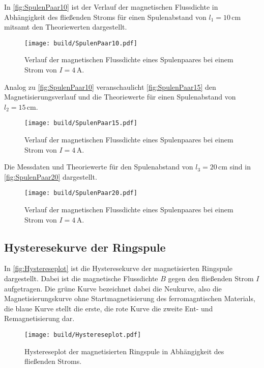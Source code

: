 In \autoref{fig:SpulenPaar10} ist der Verlauf der magnetischen Flussdichte in Abhängigkeit des fließenden Stroms
für einen Spulenabstand von $l_1= 10 \, \unit{\centi\meter}$ mitsamt den Theoriewerten dargestellt.
  \begin{figure}[H]
    \centering
    \texttt{[image: build/SpulenPaar10.pdf]}
    \caption{Verlauf der magnetischen Flussdichte eines Spulenpaares bei einem Strom von $I= 4 \, \unit{\ampere}$.}
    \label{fig:SpulenPaar10}
  \end{figure}

  \newpage
  
  Analog zu \autoref{fig:SpulenPaar10} veranschaulicht \autoref{fig:SpulenPaar15} den Magnetisierungsverlauf und die Theoriewerte
  für einen Spulenabstand von $l_2=15\, \unit{\centi\meter}$.
  \begin{figure}[H]
    \centering
    \texttt{[image: build/SpulenPaar15.pdf]}
    \caption{Verlauf der magnetischen Flussdichte eines Spulenpaares bei einem Strom von $I= 4 \, \unit{\ampere}$.}
    \label{fig:SpulenPaar15}
  \end{figure}

  \newpage

  Die Messdaten und Theoriewerte für den Spulenabstand von $l_3=20\, \unit{\centi\meter}$ sind in 
  \autoref{fig:SpulenPaar20} dargestellt.
  \begin{figure}[H]
    \centering
    \texttt{[image: build/SpulenPaar20.pdf]}
    \caption{Verlauf der magnetischen Flussdichte eines Spulenpaares bei einem Strom von $I= 4 \, \unit{\ampere}$.}
    \label{fig:SpulenPaar20}
  \end{figure}

\newpage

\subsection{Hysteresekurve der Ringspule}

In \autoref{fig:Hystereseplot} ist die Hysteresekurve der magnetisierten Ringspule dargestellt. Dabei ist die magnetische
Flussdichte $B$ gegen den fließenden Strom $I$ aufgetragen. Die grüne Kurve bezeichnet dabei die Neukurve, also die Magnetisierungskurve
ohne Startmagnetisierung des ferromagntischen Materials, die blaue Kurve stellt die erste, die rote Kurve die zweite Ent- und Remagnetisierung dar.

\begin{figure}[H]
    \centering
    \texttt{[image: build/Hystereseplot.pdf]}
    \caption{Hystereseplot der magnetisierten Ringspule in Abhängigkeit des fließenden Stroms.}
    \label{fig:Hystereseplot}
  \end{figure}

